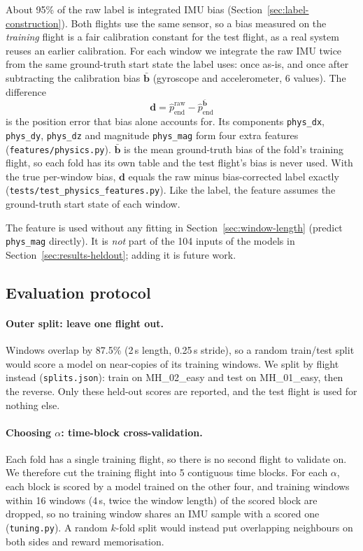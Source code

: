 About 95\% of the raw label is integrated IMU bias
(Section~\ref{sec:label-construction}). Both flights use the same sensor, so a
bias measured on the \emph{training} flight is a fair calibration constant for
the test flight, as a real system reuses an earlier calibration. For each window
we integrate the raw IMU twice from the same ground-truth start state the label
uses: once as-is, and once after subtracting the calibration bias
$\bar{\mathbf{b}}$ (gyroscope and accelerometer, 6 values). The difference
\begin{equation}
  \mathbf{d} = \hat{p}_{\text{end}}^{\text{raw}} - \hat{p}_{\text{end}}^{\bar{\mathbf{b}}}
\end{equation}
is the position error that bias alone accounts for. Its components
\texttt{phys\_dx}, \texttt{phys\_dy}, \texttt{phys\_dz} and magnitude
\texttt{phys\_mag} form four extra features (\texttt{features/physics.py}).
$\bar{\mathbf{b}}$ is the mean ground-truth bias of the fold's training flight,
so each fold has its own table and the test flight's bias is never used. With
the true per-window bias, $\mathbf{d}$ equals the raw minus bias-corrected label
exactly (\texttt{tests/test\_physics\_features.py}). Like the label, the feature
assumes the ground-truth start state of each window.

The feature is used without any fitting in Section~\ref{sec:window-length}
(predict \texttt{phys\_mag} directly). It is \emph{not} part of the 104 inputs
of the models in Section~\ref{sec:results-heldout}; adding it is future work.

\subsection{Evaluation protocol}
\label{sec:protocol}

\paragraph{Outer split: leave one flight out.}
Windows overlap by 87.5\% (2\,s length, 0.25\,s stride), so a random
train/test split would score a model on near-copies of its training windows.
We split by flight instead (\texttt{splits.json}): train on MH\_02\_easy and
test on MH\_01\_easy, then the reverse. Only these held-out scores are
reported, and the test flight is used for nothing else.

\paragraph{Choosing $\alpha$: time-block cross-validation.}
Each fold has a single training flight, so there is no second flight to
validate on. We therefore cut the training flight into 5 contiguous time
blocks. For each $\alpha$, each block is scored by a model trained on the other
four, and training windows within 16 windows (4\,s, twice the window length)
of the scored block are dropped, so no training window shares an IMU sample
with a scored one (\texttt{tuning.py}). A random $k$-fold split would instead
put overlapping neighbours on both sides and reward memorisation.

